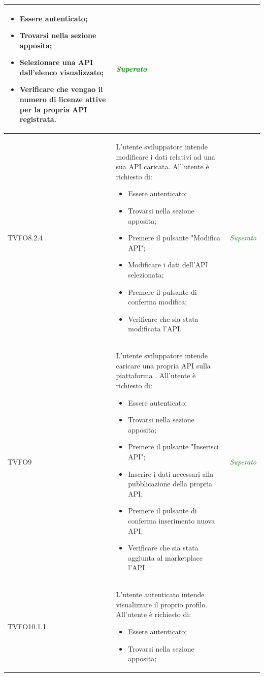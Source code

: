\begin{longtable}{|>{\centering\arraybackslash}p{2.3cm}|>{\centering\arraybackslash}p{7.5cm} | >{\centering\arraybackslash}p{4cm}|}
		\begin{itemize}
			\item Essere autenticato;
			\item Trovarsi nella sezione apposita;
			\item Selezionare una API dall'elenco visualizzato;
			\item Verificare che vengao il numero di licenze attive per la propria API registrata.
		\end{itemize} & \textcolor{Green}{\textit{Superato}}\\ \hline
		\hypertarget{TVFO8.2.4}{TVFO8.2.4} & L’utente sviluppatore intende modificare i dati relativi ad una sua API caricata. All’utente è richiesto di:
		\begin{itemize}
			\item Essere autenticato;
			\item Trovarsi nella sezione apposita;
			\item Premere il pulsante "Modifica API";
			\item Modificare i dati dell'API selezionata;
			\item Premere il pulsante di conferma modifica;
			\item Verificare che sia stata modificata l'API.
		\end{itemize} & \textcolor{Green}{\textit{Superato}}\\ \hline
		\hypertarget{TVFO9}{TVFO9} & L’utente sviluppatore intende caricare una propria API sulla piattaforma \progetto. All’utente è richiesto di:
		\begin{itemize}
			\item Essere autenticato;
			\item Trovarsi nella sezione apposita;
			\item Premere il pulsante "Inserisci API";
			\item Inserire i dati necessari alla pubblicazione della propria API;
			\item Premere il pulsante di conferma inserimento nuova API;
			\item Verificare che sia stata aggiunta al marketplace l'API.
		\end{itemize} & \textcolor{Green}{\textit{Superato}}\\ \hline
		\hypertarget{TVFO10.1.1}{TVFO10.1.1} & L’utente autenticato intende visualizzare il proprio profilo. All’utente è richiesto di:
		\begin{itemize}
			\item Essere autenticato;
			\item Trovarsi nella sezione apposita;

\end{itemize}
\end{longtable}
